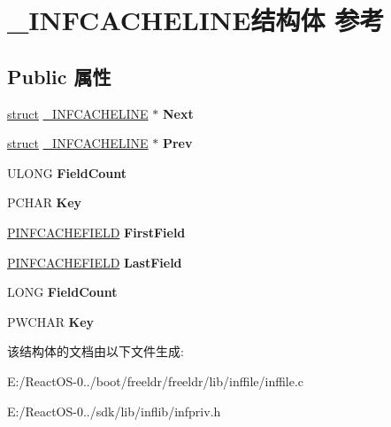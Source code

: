 \hypertarget{struct___i_n_f_c_a_c_h_e_l_i_n_e}{}\section{\+\_\+\+I\+N\+F\+C\+A\+C\+H\+E\+L\+I\+N\+E结构体 参考}
\label{struct___i_n_f_c_a_c_h_e_l_i_n_e}
\subsection*{Public 属性}
\begin{DoxyCompactItemize}
\item 
\mbox{\label{struct___i_n_f_c_a_c_h_e_l_i_n_e_abf77e32a9ff87d5162da784f835309b9}} 
\hyperlink{interfacestruct}{struct} \hyperlink{struct___i_n_f_c_a_c_h_e_l_i_n_e}{\+\_\+\+I\+N\+F\+C\+A\+C\+H\+E\+L\+I\+NE} $\ast$ {\bfseries Next}
\item 
\mbox{\label{struct___i_n_f_c_a_c_h_e_l_i_n_e_a6ea58080c5ae3598117f4dfe0b7e9d96}} 
\hyperlink{interfacestruct}{struct} \hyperlink{struct___i_n_f_c_a_c_h_e_l_i_n_e}{\+\_\+\+I\+N\+F\+C\+A\+C\+H\+E\+L\+I\+NE} $\ast$ {\bfseries Prev}
\item 
\mbox{\label{struct___i_n_f_c_a_c_h_e_l_i_n_e_a36a5c23d4a51a7a4ab1cfb89e1be1042}} 
U\+L\+O\+NG {\bfseries Field\+Count}
\item 
\mbox{\label{struct___i_n_f_c_a_c_h_e_l_i_n_e_a944577b2dbdf2b7bc9132f9e39ded6ad}} 
P\+C\+H\+AR {\bfseries Key}
\item 
\mbox{\label{struct___i_n_f_c_a_c_h_e_l_i_n_e_a0be770e438d7d6f92496d41ebc7c8dcb}} 
\hyperlink{struct___i_n_f_c_a_c_h_e_f_i_e_l_d}{P\+I\+N\+F\+C\+A\+C\+H\+E\+F\+I\+E\+LD} {\bfseries First\+Field}
\item 
\mbox{\label{struct___i_n_f_c_a_c_h_e_l_i_n_e_a0ebf3bced72974b640b819630d29cd5f}} 
\hyperlink{struct___i_n_f_c_a_c_h_e_f_i_e_l_d}{P\+I\+N\+F\+C\+A\+C\+H\+E\+F\+I\+E\+LD} {\bfseries Last\+Field}
\item 
\mbox{\label{struct___i_n_f_c_a_c_h_e_l_i_n_e_a62d5aefb0a6a06e0c64f1fb9a36f75bf}} 
L\+O\+NG {\bfseries Field\+Count}
\item 
\mbox{\label{struct___i_n_f_c_a_c_h_e_l_i_n_e_aec7a76db88a3d9707a152bf30fb7e7ee}} 
P\+W\+C\+H\+AR {\bfseries Key}
\end{DoxyCompactItemize}


该结构体的文档由以下文件生成\+:\begin{DoxyCompactItemize}
\item 
E\+:/\+React\+O\+S-\/0../boot/freeldr/freeldr/lib/inffile/inffile.\+c\item 
E\+:/\+React\+O\+S-\/0../sdk/lib/inflib/infpriv.\+h\end{DoxyCompactItemize}
